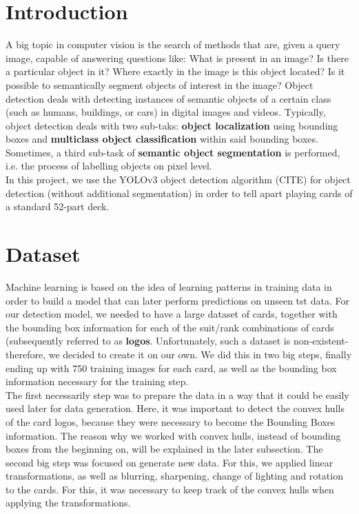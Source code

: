 \documentclass[a4paper]{article}
\begin{document}
\section{Introduction}
A big topic in computer vision is the search of methods that are, given a query image, capable of answering questions like: What is present in an image? Is there a particular object in it? Where exactly in the image is this object located? Is it possible to semantically segment objects of interest in the image?
Object detection deals with detecting instances of semantic objects of a certain class (such as humans, buildings, or cars) in digital images and videos. Typically, object detection deals with two sub-taks: \textbf{object localization} using bounding boxes and \textbf{multiclass object classification} within said bounding boxes.
Sometimes, a third sub-task of \textbf{semantic object segmentation} is performed, i.e. the process of labelling objects on pixel level.\\
In this project, we use the YOLOv3 object detection algorithm (CITE) for object detection (without additional segmentation) in order to tell apart playing cards of a standard 52-part deck.

\section{Dataset}
Machine learning is based on the idea of learning patterns in training data in order to build a model that can later perform predictions on unseen tst data. For our detection model, we needed to have a large dataset of cards, together with the bounding box information for each of the suit/rank combinations of cards (subsequently referred to as \textbf{logos}.  Unfortunately, such a dataset is non-existent- therefore, we decided to create it on our own.  We did this in two big steps, finally ending up with 750 training images for each card, as well as the bounding box information necessary for the training step.   \\
The first necessarily step was to prepare the data in  a way that it could be easily used later for data generation.  Here, it was important to detect the convex hulls of the card logos, because they were necessary to become the Bounding Boxes information.  The reason why we worked with convex hulls, instead of bounding boxes from the beginning on, will be explained in the later subsection.
The second big step was focused on generate new data.  For this, we applied linear transformations, as well as blurring, sharpening, change of lighting and rotation to the cards. 
For this, it was necessary to keep track of the convex hulls when applying the transformations. 
\end{document}
